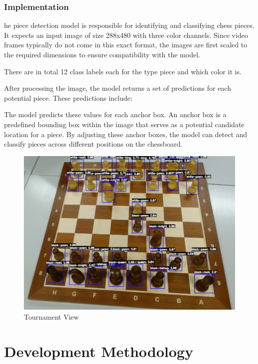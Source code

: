 \subsubsection*{Implementation}

he piece detection model is responsible for identifying and classifying chess pieces. It expects an input image of size 288x480 with three color channels. Since video frames typically do not come in this exact format, the images are first scaled to the required dimensions to ensure compatibility with the model.

There are in total 12 class labels each for the type piece and which color it is.

After processing the image, the model returns a set of predictions for each potential piece. These predictions include:

The model predicts these values for each anchor box. An anchor box is a predefined bounding box within the image that serves as a potential candidate location for a piece. By adjusting these anchor boxes, the model can detect and classify pieces across different positions on the chessboard.


\begin{subfigure}[h!]{0.9\linewidth} \centering \includegraphics[width=\linewidth]{figures/methods/ml-models/piece-model.png} \caption{Tournament View} \end{subfigure}



\section{Development Methodology}
\label{sec:development-methodology}

